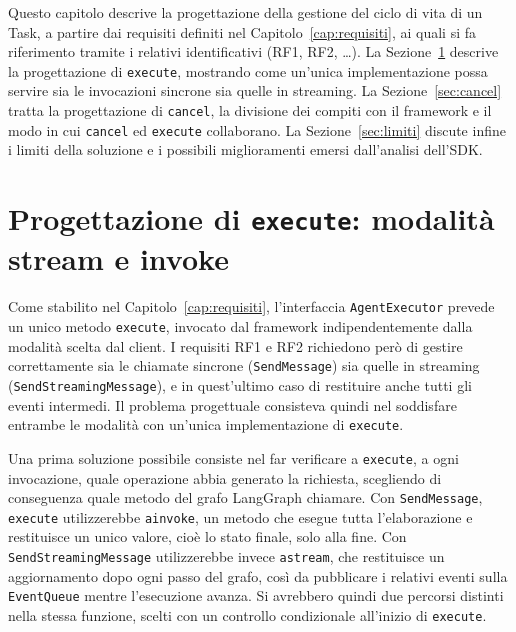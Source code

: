\label{cap:progettazione}

Questo capitolo descrive la progettazione della gestione del ciclo di vita di un Task, a partire dai requisiti definiti nel Capitolo~\ref{cap:requisiti}, ai quali si fa riferimento tramite i relativi identificativi (RF1, RF2, \ldots). La Sezione~\ref{sec:execute} descrive la progettazione di \texttt{execute}, mostrando come un'unica implementazione possa servire sia le invocazioni sincrone sia quelle in streaming. La Sezione~\ref{sec:cancel} tratta la progettazione di \texttt{cancel}, la divisione dei compiti con il framework e il modo in cui \texttt{cancel} ed \texttt{execute} collaborano. La Sezione~\ref{sec:limiti} discute infine i limiti della soluzione e i possibili miglioramenti emersi dall'analisi dell'SDK.



\section{Progettazione di \texorpdfstring{\texttt{execute}}{execute}: modalità stream e invoke}
\label{sec:execute}

Come stabilito nel Capitolo~\ref{cap:requisiti}, l'interfaccia \texttt{AgentExecutor} prevede un unico metodo \texttt{execute}, invocato dal framework indipendentemente dalla modalità scelta dal client. I requisiti RF1 e RF2 richiedono però di gestire correttamente sia le chiamate sincrone (\texttt{SendMessage}) sia quelle in streaming (\texttt{SendStreamingMessage}), e in quest'ultimo caso di restituire anche tutti gli eventi intermedi. Il problema progettuale consisteva quindi nel soddisfare entrambe le modalità con un'unica implementazione di \texttt{execute}.

Una prima soluzione possibile consiste nel far verificare a \texttt{execute}, a ogni invocazione, quale operazione abbia generato la richiesta, scegliendo di conseguenza quale metodo del grafo LangGraph chiamare. Con \texttt{SendMessage}, \texttt{execute} utilizzerebbe \texttt{ainvoke}, un metodo che esegue tutta l'elaborazione e restituisce un unico valore, cioè lo stato finale, solo alla fine. Con \texttt{SendStreamingMessage} utilizzerebbe invece \texttt{astream}, che restituisce un aggiornamento dopo ogni passo del grafo, così da pubblicare i relativi eventi sulla \texttt{EventQueue} mentre l'esecuzione avanza. Si avrebbero quindi due percorsi distinti nella stessa funzione, scelti con un controllo condizionale all'inizio di \texttt{execute}. 

